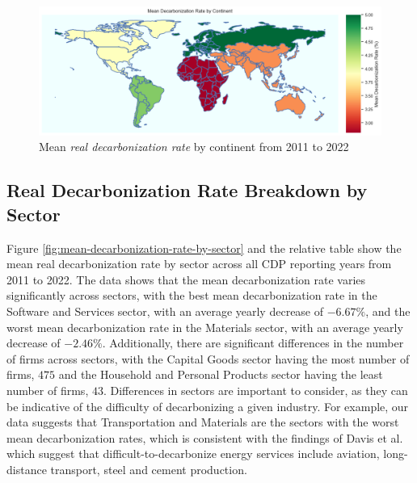 \noindent 

\begin{figure}[H]
    \begin{center}
    \includegraphics[width=5in]{figures/mean_decarbonization_rate_by_continent.png}
    \caption{Mean \textit{real decarbonization rate} by continent from 2011 to 2022}
    \label{fig:emission-breakdown-by-continent}
    \end{center}
\end{figure}
  




\subsection{Real Decarbonization Rate Breakdown by Sector}

\noindent Figure \ref{fig:mean-decarbonization-rate-by-sector} and the relative table show the mean real decarbonization rate by sector across all CDP reporting years from 2011 to 2022. The data shows that the mean decarbonization rate varies significantly across sectors, with the best mean decarbonization rate in the Software and Services sector, with an average yearly decrease of $-6.67 \%$, and the worst mean decarbonization rate in the Materials sector, with an average yearly decrease of $-2.46\%$. Additionally, there are significant differences in the number of firms across sectors, with the Capital Goods sector having the most number of firms, $475$ and the Household and Personal Products sector having the least number of firms, $43$. Differences in sectors are important to consider, as they can be indicative of the difficulty of decarbonizing a given industry. For example, our data suggests that Transportation and Materials are the sectors with the worst mean decarbonization rates, which is consistent with the findings of Davis et al. \cite{Davis2018Net-zero} which suggest that difficult-to-decarbonize energy services include aviation, long-distance transport, steel and cement production.

